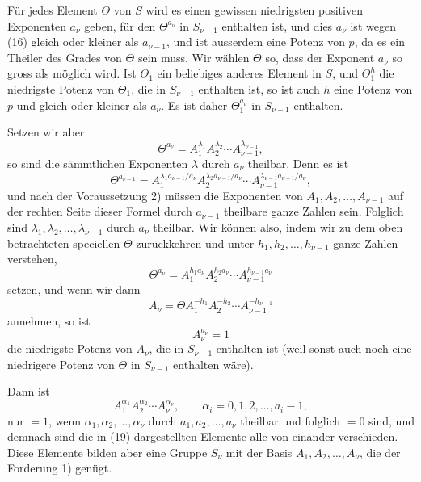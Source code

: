 \documentclass[11pt]{article}
\begin{document}
Für jedes Element $\Theta$ von $S$ wird es einen gewissen niedrigsten positiven Exponenten $a_\nu$ geben, für den $\Theta^{a_\nu}$ in $S_{\nu-1}$ enthalten ist, und dies $a_\nu$ ist wegen (16) gleich oder kleiner als $a_{\nu-1}$, und ist ausserdem eine Potenz von $p$, da es ein Theiler des Grades von $\Theta$ sein muss. Wir wählen $\Theta$ so, dass der Exponent $a_\nu$ so gross als möglich wird. Ist $\Theta_1$ ein beliebiges anderes Element in $S$, und $\Theta_1^h$ die niedrigste Potenz von $\Theta_1$, die in $S_{\nu-1}$ enthalten ist, so ist auch $h$ eine Potenz von $p$ und gleich oder kleiner als $a_\nu$. Es ist daher $\Theta_1^{a_\nu}$ in $S_{\nu-1}$ enthalten.

Setzen wir aber
\begin{equation}
\Theta^{a_\nu}=A_1^{\lambda_1}A_2^{\lambda_2}\cdots A_{\nu-1}^{\lambda_{\nu-1}},
\tag{17}
\end{equation}
so sind die sämmtlichen Exponenten $\lambda$ durch $a_\nu$ theilbar. Denn es ist
\[
\Theta^{a_{\nu-1}}=A_1^{\lambda_1 a_{\nu-1}/a_\nu}
A_2^{\lambda_2 a_{\nu-1}/a_\nu}
\cdots
A_{\nu-1}^{\lambda_{\nu-1}a_{\nu-1}/a_\nu},
\]
und nach der Voraussetzung 2) müssen die Exponenten von $A_1,A_2,\ldots,A_{\nu-1}$ auf der rechten Seite dieser Formel durch $a_{\nu-1}$ theilbare ganze Zahlen sein. Folglich sind $\lambda_1,\lambda_2,\ldots,\lambda_{\nu-1}$ durch $a_\nu$ theilbar. Wir können also, indem wir zu dem oben betrachteten speciellen $\Theta$ zurückkehren und unter $h_1,h_2,\ldots,h_{\nu-1}$ ganze Zahlen verstehen,
\[
\Theta^{a_\nu}=A_1^{h_1a_\nu}A_2^{h_2a_\nu}\cdots A_{\nu-1}^{h_{\nu-1}a_\nu}
\]
setzen, und wenn wir dann
\[
A_\nu=\Theta A_1^{-h_1}A_2^{-h_2}\cdots A_{\nu-1}^{-h_{\nu-1}}
\]
annehmen, so ist
\begin{equation}
A_\nu^{a_\nu}=1
\tag{18}
\end{equation}
die niedrigste Potenz von $A_\nu$, die in $S_{\nu-1}$ enthalten ist (weil sonst auch noch eine niedrigere Potenz von $\Theta$ in $S_{\nu-1}$ enthalten wäre).

Dann ist
\begin{equation}
A_1^{\alpha_1}A_2^{\alpha_2}\cdots A_\nu^{\alpha_\nu},
\qquad
\alpha_i=0,1,2,\ldots,a_i-1,
\tag{19}
\end{equation}
nur $=1$, wenn $\alpha_1,\alpha_2,\ldots,\alpha_\nu$ durch $a_1,a_2,\ldots,a_\nu$ theilbar und folglich $=0$ sind, und demnach sind die in (19) dargestellten Elemente alle von einander verschieden. Diese Elemente bilden aber eine Gruppe $S_\nu$ mit der Basis $A_1,A_2,\ldots,A_\nu$, die der Forderung 1) genügt.
\end{document}
